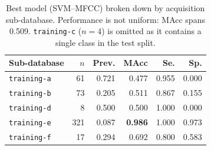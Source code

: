 \begin{table}[t]
\centering
\caption{Best model (SVM--MFCC) broken down by acquisition sub-database.
Performance is not uniform: MAcc spans \num{0.509}. \texttt{training-c}
($n=4$) is omitted as it contains a single class in the test split.}
\label{tab:persite}
\begin{tabular}{lrrrrr}
\toprule
Sub-database & $n$ & Prev. & MAcc & Se. & Sp. \\
\midrule
\texttt{training-a} & 61  & 0.721 & 0.477 & 0.955 & 0.000 \\
\texttt{training-b} & 73  & 0.205 & 0.511 & 0.867 & 0.155 \\
\texttt{training-d} & 8   & 0.500 & 0.500 & 1.000 & 0.000 \\
\texttt{training-e} & 321 & 0.087 & \textbf{0.986} & 1.000 & 0.973 \\
\texttt{training-f} & 17  & 0.294 & 0.692 & 0.800 & 0.583 \\
\bottomrule
\end{tabular}
\end{table}
